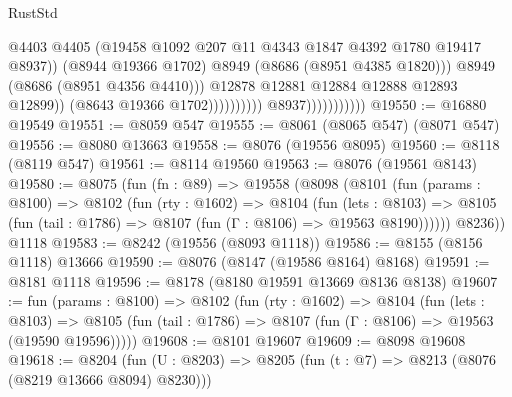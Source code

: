 \begin{lexlean}{RustStd}
\begin{coremodule}
                                                      @4403
                                                      @4405
                                                      (@19458
                                                        @1092
                                                        @207
                                                        @11
                                                        @4343
                                                        @1847
                                                        @4392
                                                        @1780
                                                        @19417
                                                        @8937))
                                                    (@8944 @19366 @1702)
                                                    @8949
                                                    (@8686 (@8951 @4385 @1820)))
                                                  @8949
                                                  (@8686 (@8951 @4356 @4410)))
                                                @12878
                                                @12881
                                                @12884
                                                @12888
                                                @12893
                                                @12899))
                                            (@8643 @19366 @1702))))))))))
                          @8937)))))))))))
@19550 := @16880 @19549
@19551 := @8059 @547
@19555 := @8061 (@8065 @547) (@8071 @547)
@19556 := @8080 @13663
@19558 := @8076 (@19556 @8095)
@19560 := @8118 (@8119 @547)
@19561 := @8114 @19560
@19563 := @8076 (@19561 @8143)
@19580 := @8075
    (fun (fn : @89) =>
    @19558
      (@8098
        (@8101
          (fun (params : @8100) =>
          @8102
            (fun (rty : @1602) =>
            @8104
              (fun (lets : @8103) =>
              @8105 (fun (tail : @1786) => @8107 (fun (Γ : @8106) => @19563 @8190))))))
        @8236))
    @1118
@19583 := @8242 (@19556 (@8093 @1118))
@19586 := @8155 (@8156 @1118) @13666
@19590 := @8076 (@8147 (@19586 @8164) @8168)
@19591 := @8181 @1118
@19596 := @8178 (@8180 @19591 @13669 @8136 @8138)
@19607 := fun (params : @8100) =>
  @8102
    (fun (rty : @1602) =>
    @8104
      (fun (lets : @8103) =>
      @8105 (fun (tail : @1786) => @8107 (fun (Γ : @8106) => @19563 (@19590 @19596)))))
@19608 := @8101 @19607
@19609 := @8098 @19608
@19618 := @8204
    (fun (U : @8203) => @8205 (fun (t : @7) => @8213 (@8076 (@8219 @13666 @8094) @8230)))

\end{coremodule}
\end{lexlean}
